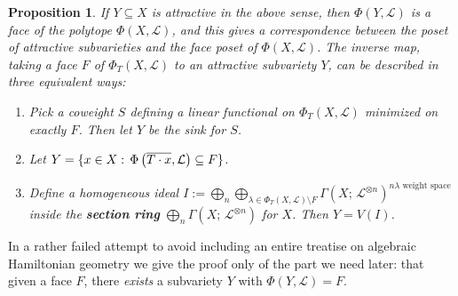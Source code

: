 \documentclass[11pt]{amsart}
\newtheorem{proposition}[Thm]{Proposition}
\theoremstyle{definition}
\newcommand{\RR}{\mathbb{R}}
\newcommand\defn[1]{{\bf #1}}
\newcommand\Oplus\bigoplus
\newcommand\tensor\otimes
\newcommand\calL{{\mathcal L}}
\newcommand\junk[1]{}
\renewcommand{\colon}{\mathrel{:}}
\renewcommand{\colon}{:\mkern\thinmuskip}
\begin{document}
\begin{proposition}\label{prop:faceCorrespondence}
  If $Y \subseteq X$ is attractive in the above sense, then $\Phi(Y,\calL)$
  is a face of the polytope $\Phi(X,\calL)$, and this gives a
  correspondence between the poset of attractive subvarieties
  and the face poset of $\Phi(X,\calL)$.
  The inverse map, taking a face $F$ of $\Phi_T(X,\calL)$ to an attractive
  subvariety $Y$, can be described in three equivalent ways:
  \begin{enumerate}
  \item Pick a coweight $S$ defining a linear functional on $\Phi_T(X,\calL)$
    minimized on exactly $F$. Then let $Y$ be the sink for $S$.
  \item Let $Y = \{x\in X\colon \Phi \left(\overline{T\cdot x},\calL \right)
    \subseteq F\}$.
  \item Define a homogeneous ideal
    $I := \Oplus_n \Oplus_{\lambda \in \Phi_T(X,\calL)\setminus F}
    \Gamma(X;\, \calL^{\tensor n})^{n\lambda\text{ weight space}}$
    inside the \defn{section ring} $\Oplus_n \Gamma(X;\, \calL^{\tensor n})$
    for $X$. Then $Y = V(I)$. 
  \end{enumerate}
  \junk{In the toric case $\dim Y = \dim_\RR \Phi(Y,\calL)$, but in general
    we only have $\geq$.}
\end{proposition}

In a rather failed attempt to avoid including an entire treatise on algebraic
Hamiltonian geometry we give the proof only of the part we need later:
that given a face $F$, there {\em exists} a subvariety $Y$ with
$\Phi(Y,\calL) = F$.
\end{document}
